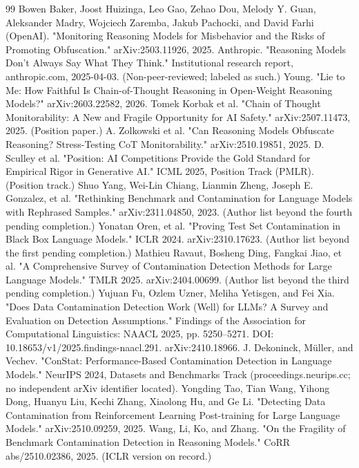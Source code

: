 \documentclass[11pt,a4paper]{article}
\begin{document}
\begin{thebibliography}{99}
 Bowen Baker, Joost Huizinga, Leo Gao, Zehao Dou, Melody Y. Guan, Aleksander Madry, Wojciech Zaremba, Jakub Pachocki, and David Farhi (OpenAI). "Monitoring Reasoning Models for Misbehavior and the Risks of Promoting Obfuscation." arXiv:2503.11926, 2025.
 Anthropic. "Reasoning Models Don't Always Say What They Think." Institutional research report, anthropic.com, 2025-04-03. (Non-peer-reviewed; labeled as such.)
 Young. "Lie to Me: How Faithful Is Chain-of-Thought Reasoning in Open-Weight Reasoning Models?" arXiv:2603.22582, 2026.
 Tomek Korbak et al. "Chain of Thought Monitorability: A New and Fragile Opportunity for AI Safety." arXiv:2507.11473, 2025. (Position paper.)
 A. Zolkowski et al. "Can Reasoning Models Obfuscate Reasoning? Stress-Testing CoT Monitorability." arXiv:2510.19851, 2025.
 D. Sculley et al. "Position: AI Competitions Provide the Gold Standard for Empirical Rigor in Generative AI." ICML 2025, Position Track (PMLR). (Position track.)
 Shuo Yang, Wei-Lin Chiang, Lianmin Zheng, Joseph E. Gonzalez, et al. "Rethinking Benchmark and Contamination for Language Models with Rephrased Samples." arXiv:2311.04850, 2023. (Author list beyond the fourth pending completion.)
 Yonatan Oren, et al. "Proving Test Set Contamination in Black Box Language Models." ICLR 2024. arXiv:2310.17623. (Author list beyond the first pending completion.)
 Mathieu Ravaut, Bosheng Ding, Fangkai Jiao, et al. "A Comprehensive Survey of Contamination Detection Methods for Large Language Models." TMLR 2025. arXiv:2404.00699. (Author list beyond the third pending completion.)
 Yujuan Fu, Ozlem Uzner, Meliha Yetisgen, and Fei Xia. "Does Data Contamination Detection Work (Well) for LLMs? A Survey and Evaluation on Detection Assumptions." Findings of the Association for Computational Linguistics: NAACL 2025, pp. 5250–5271. DOI: 10.18653/v1/2025.findings-naacl.291. arXiv:2410.18966.
 J. Dekoninck, Müller, and Vechev. "ConStat: Performance-Based Contamination Detection in Language Models." NeurIPS 2024, Datasets and Benchmarks Track (proceedings.neurips.cc; no independent arXiv identifier located).
 Yongding Tao, Tian Wang, Yihong Dong, Huanyu Liu, Kechi Zhang, Xiaolong Hu, and Ge Li. "Detecting Data Contamination from Reinforcement Learning Post-training for Large Language Models." arXiv:2510.09259, 2025.
 Wang, Li, Ko, and Zhang. "On the Fragility of Benchmark Contamination Detection in Reasoning Models." CoRR abs/2510.02386, 2025. (ICLR version on record.)

\end{thebibliography}
\end{document}
